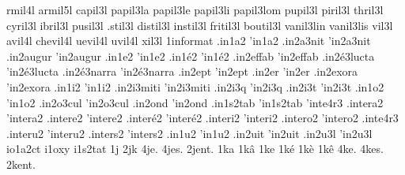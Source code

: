 {  rmil4l
 armil5l
 capil3l
 papil3la
 papil3le
 papil3li
 papil3lom
 pupil3l
 piril3l
 thril3l
 cyril3l
 ibril3l
 pusil3l
 .stil3l
distil3l
instil3l
fritil3l
boutil3l
 vanil3lin
 vanil3lis
   vil3l
  avil4l
chevil4l
 uevil4l
  uvil4l
   xil3l
                    1informat %
                    .in1a2
                    'in1a2
                    .in2a3nit
                    'in2a3nit
                    .in2augur
                    'in2augur
                    .in1e2
                    'in1e2
                    .in1\'e2
                    'in1\'e2
                    .in2effab %
                    'in2effab
                    .in2\'e3lucta
                    'in2\'e3lucta
                    .in2\'e3narra
                    'in2\'e3narra
                    .in2ept
                    'in2ept
                    .in2er
                    'in2er
                    .in2exora %
                    'in2exora
                    .in1i2
                    'in1i2
                    .in2i3miti
                    'in2i3miti
                    .in2i3q
                    'in2i3q
                    .in2i3t
                    'in2i3t
                    .in1o2
                    'in1o2
                    .in2o3cul
                    'in2o3cul
                    .in2ond
                    'in2ond
                    .in1s2tab
                    'in1s2tab
                    'inte4r3
                    .intera2
                    'intera2
                    .intere2
                    'intere2
                    .inter\'e2
                    'inter\'e2
                    .interi2
                    'interi2
                    .intero2
                    'intero2
                    .inte4r3
                    .interu2
                    'interu2
                    .inters2
                    'inters2
                    .in1u2
                    'in1u2
                    .in2uit
                    'in2uit
                    .in2u3l
                    'in2u3l
                    io1a2ct
                    i1oxy
                    i1s2tat
1j
2jk
4je.
4jes.
2jent. %
1ka
1k\^a
1ke
1k\'e
1k\`e
1k\^e
4ke.
4kes.
2kent. %
}
